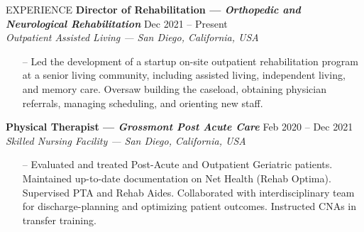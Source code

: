 \documentclass{resume} %
\begin{document}
\begin{rSection}{EXPERIENCE}
\textbf{Director of Rehabilitation --- \textit{Orthopedic and Neurological Rehabilitation}} \hfill Dec 2021 -- Present\\
\textit{Outpatient Assisted Living --- San Diego, California, USA}
\vspace*{-0.2cm}\begin{itemize}
    \item[--] Led the development of a startup on-site outpatient rehabilitation program at a senior living community, including assisted living, independent living, and memory care. Oversaw building the caseload, obtaining physician referrals, managing scheduling, and orienting new staff.
\end{itemize}

\textbf{Physical Therapist --- \textit{Grossmont Post Acute Care}} \hfill Feb 2020 -- Dec 2021\\
\textit{Skilled Nursing Facility --- San Diego, California, USA}
\vspace*{-0.2cm}\begin{itemize}
    \item[--] Evaluated and treated Post-Acute and Outpatient Geriatric patients. Maintained up-to-date documentation on Net Health (Rehab Optima). Supervised PTA and Rehab Aides. Collaborated with interdisciplinary team for discharge-planning and optimizing patient outcomes. Instructed CNAs in transfer training.

\end{itemize}
\end{rSection}
\end{document}
